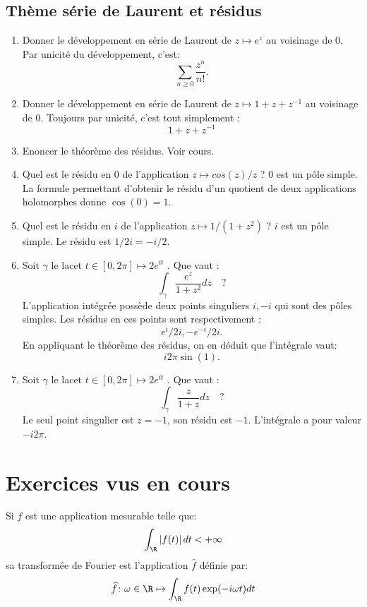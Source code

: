 \documentclass[a4paper, 12pt]{amsart}
\begin{document}
\subsection{Thème série de Laurent et résidus}
\begin{enumerate}
	\item Donner le développement en série de Laurent de $z \mapsto e^z$ au voisinage de 0.
    Par unicité du développement, c'est:
    \[
    \sum_{n \geq 0} \frac{z^n}{n!}.
    \]
	\item Donner le développement en série de Laurent de $z \mapsto 1+z+z^{-1}$ au voisinage de 0.
	Toujours par unicité, c'est tout simplement :
    \[
    1+z+z^{-1}
    \]
	\item Enoncer le théorème des résidus.
	Voir cours.
	\item Quel est le résidu en 0 de l'application $z \mapsto cos(z)/z$ ?
	$0$ est un pôle simple. La formule permettant d'obtenir le résidu d'un quotient de deux applications holomorphes donne $\cos(0) = 1.$
	\item Quel est le résidu en $i$ de l'application $z \mapsto 1/(1 + z^2 )$ ?
    $i$ est un pôle simple. Le résidu est $1/2i = -i/2.$
	\item Soit $\gamma$ le lacet $t \in [0, 2\pi] \mapsto 2e^{it}$ . Que vaut :
\[
\int_{\gamma} \frac{e^z}{1+z^2}dz\quad ?
\]
    L'application intégrée possède deux points singuliers $i,-i$ qui sont des pôles simples. Les résidus en ces points sont respectivement :
    \[
    e^i/2i, -e^{-i}/2i.
    \]
    En appliquant le théorème des résidus, on en déduit que l'intégrale vaut:
    \[
    i 2 \pi \sin (1).
    \]
	\item Soit $\gamma$ le lacet $t \in [0, 2\pi] \mapsto 2e^{it}$ . Que vaut :
	\[
	\int_{\gamma} \frac{z}{1+z}dz\quad ?
	\]
    Le seul point singulier est $z=-1$, son résidu est $-1.$ L'intégrale a pour valeur $-i2 \pi.$
\end{enumerate}
\section{Exercices vus en cours}
Si $f$ est une application mesurable telle que:
\[
\int_\R \left | f(t) \right| dt < +\infty
\]
sa transformée de Fourier est l'application $\widehat{f}$ définie par:
\[
\widehat{f} \colon \omega \in \R \mapsto \int_{\R} f(t) \exp(-i \omega t ) dt
\]

\end{document}
